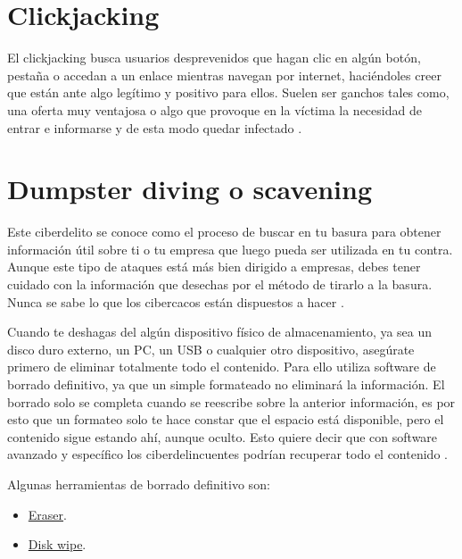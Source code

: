 \documentclass[
  a4paper,
  openany]{book}
\begin{document}
\hypertarget{clickjacking}{%
\section{Clickjacking}\label{clickjacking}}

El clickjacking busca usuarios desprevenidos que hagan clic en algún botón, pestaña o accedan a un enlace mientras navegan por internet, haciéndoles creer que están ante algo legítimo y positivo para ellos. Suelen ser ganchos tales como, una oferta muy ventajosa o algo que provoque en la víctima la necesidad de entrar e informarse y de esta modo quedar infectado \citep{WIKI-clickjacking}.

\hypertarget{dumpster-diving-o-scavening}{%
\section{Dumpster diving o scavening}\label{dumpster-diving-o-scavening}}

Este ciberdelito se conoce como el proceso de buscar en tu basura para obtener información útil sobre ti o tu empresa que luego pueda ser utilizada en tu contra. Aunque este tipo de ataques está más bien dirigido a empresas, debes tener cuidado con la información que desechas por el método de tirarlo a la basura. Nunca se sabe lo que los cibercacos están dispuestos a hacer \citep{WIKI-dumpster-diving}.

Cuando te deshagas del algún dispositivo físico de almacenamiento, ya sea un disco duro externo, un PC, un USB o cualquier otro dispositivo, asegúrate primero de eliminar totalmente todo el contenido. Para ello utiliza software de borrado definitivo, ya que un simple formateado no eliminará la información. El borrado solo se completa cuando se reescribe sobre la anterior información, es por esto que un formateo solo te hace constar que el espacio está disponible, pero el contenido sigue estando ahí, aunque oculto. Esto quiere decir que con software avanzado y específico los ciberdelincuentes podrían recuperar todo el contenido \citep{XATAKA-borrado-almacenamiento}.

Algunas herramientas de borrado definitivo son:

\begin{itemize}
\item
  \href{https://eraser.heidi.ie/}{Eraser}.
\item
  \href{https://www.diskwipe.org/download.php}{Disk wipe}.
\end{itemize}
\end{document}

